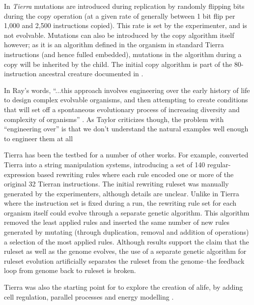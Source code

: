In \emph{Tierra} \parencite{Ray1991} mutations are introduced during replication by randomly flipping bits during the copy operation (at a given rate of generally between 1 bit flip per 1,000 and 2,500 instructions copied). This rate is set by the experimenter, and is not evolvable. Mutations can also be introduced by the copy algorithm itself however; as it is an algorithm defined in the organism in standard Tierra instructions (and hence fulled embedded), mutations in the algorithm during a copy will be inherited by the child. The initial copy algorithm is part of the 80-instruction ancestral creature documented in \textcite[app.C]{Ray1991}.

In Ray's words, ``...this approach involves engineering over the early history of life to design complex evolvable organisms, and then attempting to create conditions that will set off a spontaneous evolutionary process of increasing diversity and complexity of organisms'' \parencite[p.3]{Ray1991}. As Taylor criticizes though, the problem with ``engineering over'' is that we don't understand the natural examples well enough to engineer them at all \parencite{Taylor2001}

Tierra has been the testbed for a number of other works. For example, \textcite{SugiuraSuzukiShioseEtAl2003} converted Tierra into a string manipulation systems, introducing a set of 140 regular-expression based rewriting rules where each rule encoded one or more of the original 32 Tierran instructions. The initial rewriting ruleset was manually generated by the experimenters, although details are unclear. Unlike in Tierra where the instruction set is fixed during a run, the rewriting rule set for each organism itself could evolve through a separate genetic algorithm. This algorithm removed the least applied rules and inserted the same number of new rules generated by mutating (through duplication, removal and addition of operations) a selection of the most applied rules. Although results support the claim that the ruleset as well as the genome evolves, the use of a separate genetic algorithm for ruleset evolution artificially separates the ruleset from the genome--the feedback loop from genome back to ruleset is broken.

Tierra was also the starting point for \textcite{Taylor2001, Taylor:1999sc} to explore the creation of \gls{alife}, by adding cell regulation, parallel processes and energy modelling \textcite[p.4]{Taylor:1999sc}.


